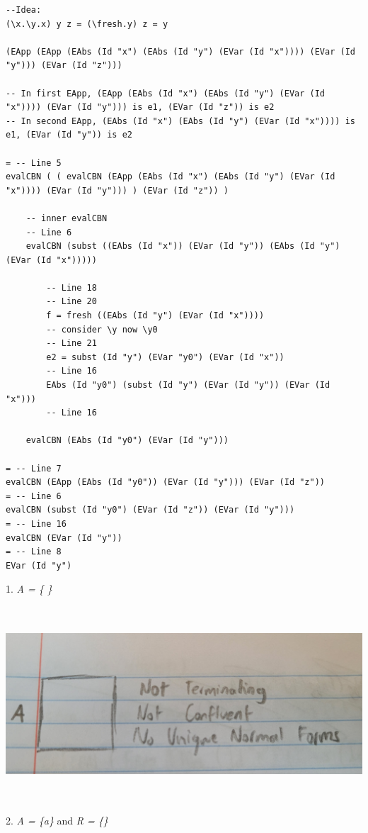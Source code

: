 \documentclass{article}
\theoremstyle{theorem}
\theoremstyle{definition}
\theoremstyle{remark}
\begin{document}
\begin{lstlisting}
--Idea:
(\x.\y.x) y z = (\fresh.y) z = y

(EApp (EApp (EAbs (Id "x") (EAbs (Id "y") (EVar (Id "x")))) (EVar (Id "y"))) (EVar (Id "z")))

-- In first EApp, (EApp (EAbs (Id "x") (EAbs (Id "y") (EVar (Id "x")))) (EVar (Id "y"))) is e1, (EVar (Id "z")) is e2
-- In second EApp, (EAbs (Id "x") (EAbs (Id "y") (EVar (Id "x")))) is e1, (EVar (Id "y")) is e2

= -- Line 5
evalCBN ( ( evalCBN (EApp (EAbs (Id "x") (EAbs (Id "y") (EVar (Id "x")))) (EVar (Id "y"))) ) (EVar (Id "z")) )

    -- inner evalCBN
    -- Line 6
    evalCBN (subst ((EAbs (Id "x")) (EVar (Id "y")) (EAbs (Id "y") (EVar (Id "x")))))

        -- Line 18
        -- Line 20
        f = fresh ((EAbs (Id "y") (EVar (Id "x"))))
        -- consider \y now \y0
        -- Line 21
        e2 = subst (Id "y") (EVar "y0") (EVar (Id "x"))
        -- Line 16
        EAbs (Id "y0") (subst (Id "y") (EVar (Id "y")) (EVar (Id "x")))
        -- Line 16

    evalCBN (EAbs (Id "y0") (EVar (Id "y")))

= -- Line 7
evalCBN (EApp (EAbs (Id "y0")) (EVar (Id "y"))) (EVar (Id "z"))
= -- Line 6
evalCBN (subst (Id "y0") (EVar (Id "z")) (EVar (Id "y")))
= -- Line 16
evalCBN (EVar (Id "y"))
= -- Line 8
EVar (Id "y")
\end{lstlisting}
1. \textit{A = \{ \}}
\\ \includegraphics[width=15cm, height=8cm]{Report Images/week7_1.jpg}
\\2. \textit{A = \{a\}} and \textit{R = \{\}}
\end{document}

